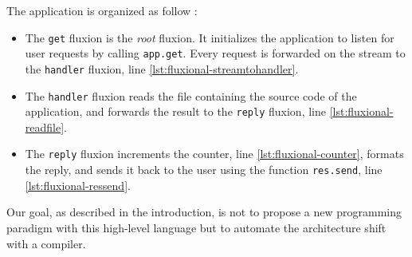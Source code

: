 The application is organized as follow :
\begin{itemize}
  \item The \texttt{get} fluxion is the \textit{root} fluxion.
  It initializes the application to listen for user requests by calling \texttt{app.get}.
  Every request is forwarded on the stream to the \texttt{handler} fluxion, line \ref{lst:fluxional-streamtohandler}.
  \item The \texttt{handler} fluxion reads the file containing the source code of the application, and forwards the result to the \texttt{reply} fluxion, line \ref{lst:fluxional-readfile}.
  \item The \texttt{reply} fluxion increments the counter, line \ref{lst:fluxional-counter}, formats the reply, and sends it back to the user using the function \texttt{res.send}, line \ref{lst:fluxional-ressend}.
\end{itemize}

Our goal, as described in the introduction, is not to propose a new programming paradigm with this high-level language but to automate the architecture shift with a compiler.